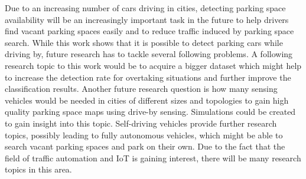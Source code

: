 Due to an increasing number of cars driving in cities, detecting parking space availability will be an increasingly important task in the future to help drivers find vacant parking spaces easily and to reduce traffic induced by parking space search. While this work shows that it is possible to detect parking cars while driving by, future research has to tackle several following problems. A following research topic to this work would be to acquire a bigger dataset which might help to increase the detection rate for overtaking situations and further improve the classification results. Another future research question is how many sensing vehicles would be needed in cities of different sizes and topologies to gain high quality parking space maps using drive-by sensing. Simulations could be created to gain insight into this topic. Self-driving vehicles provide further research topics, possibly leading to fully autonomous vehicles, which might be able to search vacant parking spaces and park on their own. Due to the fact that the field of traffic automation and IoT is gaining interest, there will be many research topics in this area.









